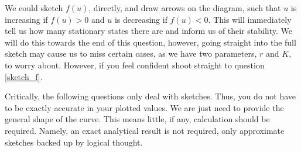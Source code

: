 \documentclass[]{article}
\begin{document}
We could sketch $f(u)$, directly, and draw arrows on the diagram, such that $u$ is increasing if $f(u)>0$ and $u$ is decreasing if $f(u)<0$. This will immediately tell us how many stationary states there are and inform us of their stability. We will do this towards the end of this question, however, going straight into the full sketch may cause us to miss certain cases, as we have two parameters, $r$ and $K$, to worry about. However, if you feel confident shoot straight to question \ref{sketch_f}.

Critically, the following questions only deal with sketches. Thus, you do not have to be exactly accurate in your plotted values. We are just need to provide the general shape of the curve. This means little, if any, calculation should be required. Namely, an exact analytical result is not required, only approximate sketches backed up by logical thought.
\end{document}
